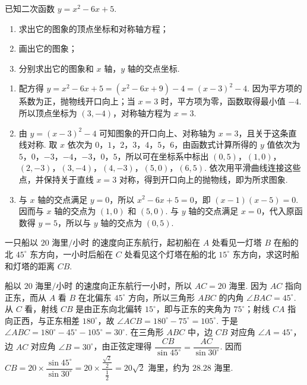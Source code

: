\begin{problem}
已知二次函数 \(y=x^2-6x+5\).

\begin{enumerate}
    \item 求出它的图象的顶点坐标和对称轴方程；
    \item 画出它的图象；
    \item 分别求出它的图象和 \(x\) 轴，\(y\) 轴的交点坐标.
\end{enumerate}
\end{problem}

\begin{solution}
\begin{enumerate}
    \item 配方得 \(y=x^2-6x+5=\left(x^2-6x+9\right)-4=\left(x-3\right)^2-4\). 因为平方项的系数为正，抛物线开口向上；当 \(x=3\) 时，平方项为零，函数取得最小值 \(-4\). 所以顶点坐标为 \((3,-4)\)，对称轴方程为 \(x=3\).
    \item 由 \(y=\left(x-3\right)^2-4\) 可知图象的开口向上、对称轴为 \(x=3\)，且关于这条直线对称. 取 \(x\) 依次为 \(0\)，\(1\)，\(2\)，\(3\)，\(4\)，\(5\)，\(6\)，由函数式计算所得的 \(y\) 值依次为 \(5\)，\(0\)，\(-3\)，\(-4\)，\(-3\)，\(0\)，\(5\)，所以可在坐标系中标出 \((0,5)\)，\((1,0)\)，\((2,-3)\)，\((3,-4)\)，\((4,-3)\)，\((5,0)\)，\((6,5)\). 依次用平滑曲线连接这些点，并保持关于直线 \(x=3\) 对称，得到开口向上的抛物线，即为所求图象.
    \item 与 \(x\) 轴的交点满足 \(y=0\)，所以 \(x^2-6x+5=0\)，即 \((x-1)(x-5)=0\). 因而与 \(x\) 轴的交点为 \((1,0)\) 和 \((5,0)\). 与 \(y\) 轴的交点满足 \(x=0\)，代入原函数得 \(y=5\)，所以与 \(y\) 轴的交点为 \((0,5)\).
\end{enumerate}
\end{solution}

\begin{problem}
一只船以 \(20\text{ 海里/小时}\) 的速度向正东航行，起初船在 \(A\) 处看见一灯塔 \(B\) 在船的北 \(45^\circ\) 东方向，一小时后船在 \(C\) 处看见这个灯塔在船的北 \(15^\circ\) 东方向，求这时船和灯塔的距离 \(CB\).
\end{problem}

\begin{solution}
船以 \(20\text{ 海里/小时}\) 的速度向正东航行一小时，所以 \(AC=20\text{ 海里}\). 因为 \(AC\) 指向正东，而从 \(A\) 看 \(B\) 在北偏东 \(45^\circ\) 方向，所以三角形 \(ABC\) 的内角 \(\angle BAC=45^\circ\). 从 \(C\) 看，射线 \(CB\) 是由正东向北偏转 \(15^\circ\)，即与正东的夹角为 \(75^\circ\)；射线 \(CA\) 指向正西，与正东相差 \(180^\circ\)，故 \(\angle ACB=180^\circ-75^\circ=105^\circ\). 于是 \(\angle ABC=180^\circ-45^\circ-105^\circ=30^\circ\). 在三角形 \(ABC\) 中，边 \(CB\) 对应角 \(\angle A=45^\circ\)，边 \(AC\) 对应角 \(\angle B=30^\circ\)，由正弦定理得 \(\dfrac{CB}{\sin45^\circ}=\dfrac{AC}{\sin30^\circ}\). 因而 \(CB=20\times\dfrac{\sin45^\circ}{\sin30^\circ}=20\times\dfrac{\frac{\sqrt{2}}{2}}{\frac{1}{2}}=20\sqrt{2}\text{ 海里}\)，约为 \(28.28\text{ 海里}\).
\end{solution}

